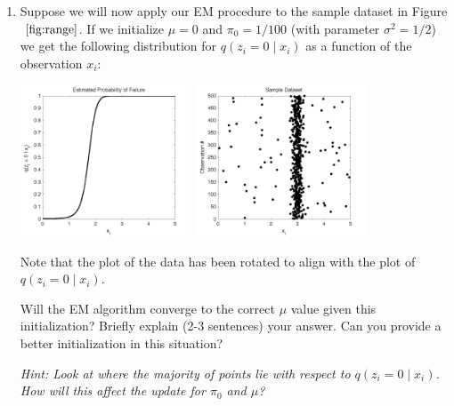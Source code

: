 \begin{enumerate}
    
\item {} Suppose we will now apply our EM procedure to the
  sample dataset in Figure$~\ref{fig:range}$. If we initialize $\mu = 0$ and $\pi_0 = 1/100$
  (with parameter $\sigma^2 = 1/2$) we get the following distribution
  for $q(z_i = 0 \mid x_i)$ as a function of the observation $x_i$:
  \begin{center}
    \includegraphics[width=0.4\textwidth]{images/q_mean0.png}
    \includegraphics[width=0.4\textwidth]{images/range2.png}
  \end{center}
  Note that the plot of the data has been rotated to align with the
  plot of $q(z_i = 0 \mid x_i)$. 
  
  Will the EM algorithm converge to the correct $\mu$ value given this initialization?
  Briefly explain (2-3 sentences) your answer. Can you provide a better initialization in this situation?
  
  {\em Hint: Look at where the majority of points lie with respect to
    $q(z_i = 0 \mid x_i)$. How will this affect the update for $\pi_0$
    and $\mu$?}


\end{enumerate}
